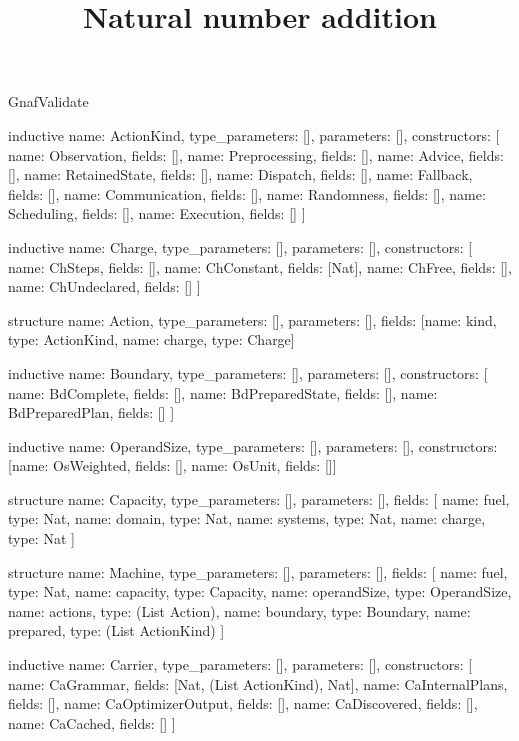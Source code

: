 \begin{lexlean}{GnafValidate}
\title{Natural number addition}
\begin{semanticmodule}
inductive{
  name: ActionKind,
  type_parameters: [],
  parameters: [],
  constructors: [
    {name: Observation, fields: []},
    {name: Preprocessing, fields: []},
    {name: Advice, fields: []},
    {name: RetainedState, fields: []},
    {name: Dispatch, fields: []},
    {name: Fallback, fields: []},
    {name: Communication, fields: []},
    {name: Randomness, fields: []},
    {name: Scheduling, fields: []},
    {name: Execution, fields: []}
  ]
}

inductive{
  name: Charge,
  type_parameters: [],
  parameters: [],
  constructors: [
    {name: ChSteps, fields: []},
    {name: ChConstant, fields: [Nat]},
    {name: ChFree, fields: []},
    {name: ChUndeclared, fields: []}
  ]
}

structure{
  name: Action,
  type_parameters: [],
  parameters: [],
  fields: [{name: kind, type: ActionKind}, {name: charge, type: Charge}]
}

inductive{
  name: Boundary,
  type_parameters: [],
  parameters: [],
  constructors: [
    {name: BdComplete, fields: []},
    {name: BdPreparedState, fields: []},
    {name: BdPreparedPlan, fields: []}
  ]
}

inductive{
  name: OperandSize,
  type_parameters: [],
  parameters: [],
  constructors: [{name: OsWeighted, fields: []}, {name: OsUnit, fields: []}]
}

structure{
  name: Capacity,
  type_parameters: [],
  parameters: [],
  fields: [
    {name: fuel, type: Nat},
    {name: domain, type: Nat},
    {name: systems, type: Nat},
    {name: charge, type: Nat}
  ]
}

structure{
  name: Machine,
  type_parameters: [],
  parameters: [],
  fields: [
    {name: fuel, type: Nat},
    {name: capacity, type: Capacity},
    {name: operandSize, type: OperandSize},
    {name: actions, type: (List Action)},
    {name: boundary, type: Boundary},
    {name: prepared, type: (List ActionKind)}
  ]
}

inductive{
  name: Carrier,
  type_parameters: [],
  parameters: [],
  constructors: [
    {name: CaGrammar, fields: [Nat, (List ActionKind), Nat]},
    {name: CaInternalPlans, fields: []},
    {name: CaOptimizerOutput, fields: []},
    {name: CaDiscovered, fields: []},
    {name: CaCached, fields: []}
  ]
}


\end{semanticmodule}
\end{lexlean}
